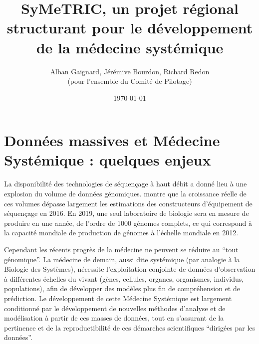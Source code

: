 \documentclass[a4paper,10pt]{article}
\title{\bf SyMeTRIC, un projet régional structurant pour le développement de la médecine systémique}
\author{
  Alban Gaignard, Jérémive Bourdon, Richard Redon \\(pour l'ensemble du Comité de Pilotage)
}
\date{\today}
\theoremstyle{definition}
\begin{document}
\parindent=0pt
\thispagestyle{empty}
\renewcommand{\labelitemi}{$\bullet$}
\renewcommand{\labelitemii}{$\circ$}
\renewcommand{\labelitemiii}{$\diamond$}


\maketitle 


\section{Données massives et Médecine Systémique : quelques enjeux} 

La disponibilité des technologies de séquençage à haut débit a donné lieu à une explosion du volume de données génomiques. \cite{bigdata} montre que la croissance réelle de ces volumes dépasse largement les estimations des constructeurs d'équipement de séquençage en 2016. En 2019, une seul laboratoire de biologie sera en mesure de produire en une année, de l'ordre de 1000 génomes complets, ce qui correspond à la capacité mondiale de production de génomes à l'échelle mondiale en 2012. 

Cependant les récents progrès de la médecine ne peuvent se réduire au ``tout génomique''. La médecine de demain, aussi dite systémique (par analogie à la Biologie des Systèmes), nécessite l'exploitation conjointe de données d'observation à différentes échelles du vivant (gènes, cellules, organes, organismes, individus, populations), afin de développer des modèles plus fin de compréhension et de prédiction. Le développement de cette Médecine Systémique est largement conditionné par le développement de nouvelles méthodes d'analyse et de modélisation à partir de ces masses de données, tout en s'assurant de la pertinence et de la reproductibilité de ces démarches scientifiques ``dirigées par les données''. 
\end{document}
